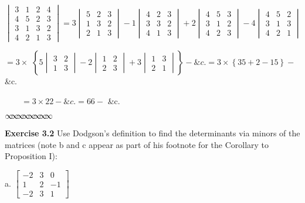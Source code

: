 \documentclass[11pt]{article}%
\theoremstyle{definition}
\newcommand{\sep}{\vspace{-3pt} \begin{center}
{\mathversion{normal}
$\infty \mspace{-5.5mu} \infty \mspace{-5.5mu}
\infty \mspace{-5.5mu} \infty \mspace{-5.5mu}
\infty \mspace{-5.5mu} \infty \mspace{-5.5mu}
\infty \mspace{-5.5mu} \infty$}
\end{center} \vspace{-3pt}}
\begin{document}
$%
\begin{vmatrix}
3 & 1 & 2 & 4\\
4 & 5 & 2 & 3\\
3 & 1 & 3 & 2\\
4 & 2 & 1 & 3
\end{vmatrix}
\mathsf{=}3%
\begin{vmatrix}
5 & 2 & 3\\
1 & 3 & 2\\
2 & 1 & 3
\end{vmatrix}
-1%
\begin{vmatrix}
4 & 2 & 3\\
3 & 3 & 2\\
4 & 1 & 3
\end{vmatrix}
+2%
\begin{vmatrix}
4 & 5 & 3\\
3 & 1 & 2\\
4 & 2 & 3
\end{vmatrix}
-4%
\begin{vmatrix}
4 & 5 & 2\\
3 & 1 & 3\\
4 & 2 & 1
\end{vmatrix}
$

\textsf{\qquad\qquad\qquad\qquad}$=3\times$ $\left\{  5%
\begin{vmatrix}
3 & 2\\
1 & 3
\end{vmatrix}
-2%
\begin{vmatrix}
1 & 2\\
2 & 3
\end{vmatrix}
+3%
\begin{vmatrix}
1 & 3\\
2 & 1
\end{vmatrix}
\right\}  -\&c.=3\times\left\{  35+2-15\right\}  -$ \textsf{\&c.}

\qquad\qquad\qquad$\qquad=3\times22-\&c.=66-$ \textsf{\&c}$.$%

\sep


\noindent\textbf{Exercise 3.2} Use Dodgson's definition to find the
determinants via minors of the matrices (note b and c appear as part of his
footnote for the Corollary to Proposition I):

a. $%
\begin{bmatrix}
-2 & 3 & 0\\
1 & 2 & -1\\
-2 & 3 & 1
\end{bmatrix}
$
\end{document}
